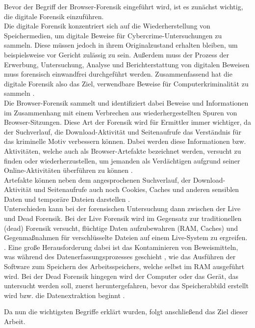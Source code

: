 Bevor der Begriff der Browser-Forensik eingeführt wird, ist es zunächst wichtig, die digitale Forensik einzuführen. \\
Die digitale Forensik konzentriert sich auf die Wiederherstellung von Speichermedien, um digitale Beweise für Cybercrime-Untersuchungen zu sammeln. Diese müssen jedoch in ihrem Originalzustand erhalten bleiben, um beispielsweise vor Gericht zulässig zu sein. Außerdem muss der Prozess der Erwerbung, Untersuchung, Analyse und Berichterstattung von digitalen Beweisen muss forensisch einwandfrei durchgeführt werden. Zusammenfassend hat die digitale Forensik also das Ziel, verwendbare Beweise für Computerkriminalität zu sammeln \cite{Izzati.2022}.\\
Die Browser-Forensik sammelt und identifiziert dabei Beweise und Informationen im Zusammenhang mit einem Verbrechen aus wiederhergestellten Spuren von Browser-Sitzungen. Diese Art der Forensik wird für Ermittler immer wichtiger, da der Suchverlauf, die Download-Aktivität und Seitenaufrufe das Verständnis für das kriminelle Motiv verbessern können. Dabei werden diese Informationen bzw. Aktivitäten, welche auch als Browser-Artefakte bezeichnet werden, versucht zu finden oder wiederherzustellen, um jemanden als Verdächtigen aufgrund seiner Online-Aktivitäten überführen zu können \cite{Mahlous.2020}. \\
Artefakte können neben dem angesprochenen Suchverlauf, der Download-Aktivität und Seitenaufrufe auch noch Cookies, Caches und anderen sensiblen Daten und temporäre Dateien darstellen \cite{Izzati.2022}.\\
Unterschieden kann bei der forensischen Untersuchung dann zwischen der Live und Dead Forensik. Bei der Live Forensik wird im Gegensatz zur traditionellen (dead) Forensik versucht, flüchtige Daten aufzubewahren (RAM, Caches) und Gegenmaßnahmen für verschlüsselte Dateien auf einem Live-System zu ergreifen. \cite{Gupta.2013}. Eine große Herausforderung dabei ist das Kontaminieren von Beweismitteln, was während des Datenerfassungsprozesses geschieht \cite{Gupta.2013}, wie das Ausführen der Software zum Speichern des Arbeitsspeichers, welche selbst im RAM ausgeführt wird. Bei der Dead Forensik hingegen wird der Computer oder das Gerät, das untersucht werden soll, zuerst heruntergefahren, bevor das Speicherabbild erstellt wird bzw. die Datenextraktion beginnt \cite{Izzati.2022}.

Da nun die wichtigsten Begriffe erklärt wurden, folgt anschließend das Ziel dieser Arbeit.

